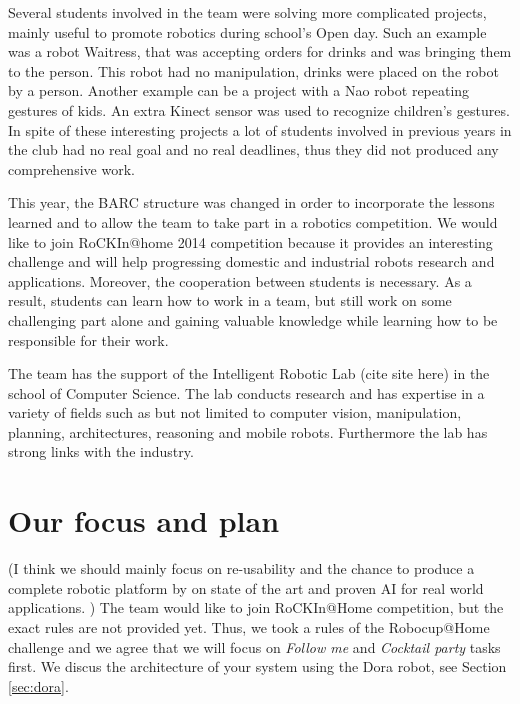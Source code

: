 \documentclass[conference]{IEEEtran}
\begin{document}
Several students involved in the team were solving more complicated projects, mainly useful to promote robotics during school's Open day. Such an example was a robot Waitress, that was accepting orders for drinks and was bringing them to the person. This robot had no manipulation, drinks were placed on the robot by a person. Another example can be a project with a Nao robot repeating gestures of kids. An extra Kinect sensor was used to recognize children's gestures. In spite of these interesting projects a lot of students involved in previous years in the club had no real goal and no real deadlines, thus they did not produced any comprehensive work.

This year, the BARC structure was changed in order to incorporate the lessons learned and to allow the team to take part in a robotics competition. We would like to join RoCKIn@home 2014 competition because it provides an interesting challenge and will help progressing domestic and industrial robots research and applications. Moreover, the cooperation between students is necessary. As a result, students can learn how to work in a team, but still work on some challenging part alone and gaining valuable knowledge while learning how to be responsible for their work.

The team has the support of the Intelligent Robotic Lab (cite site here) in the school of Computer Science. The lab conducts research and has expertise in a variety of fields such as but not limited to computer vision, manipulation, planning, architectures, reasoning and mobile robots. Furthermore the lab has strong links with the industry. 

 
\section{Our focus and plan}
(I think we should mainly focus on re-usability and the chance to produce a complete robotic platform by on state of the art and proven AI for real world applications. )
The team would like to join RoCKIn@Home competition, but the exact rules are not provided yet. Thus, we took a rules of the Robocup@Home challenge and we agree that we will focus on \textit{Follow me} and \textit{Cocktail party} tasks first. We discus the architecture of your system using the Dora robot, see Section \ref{sec:dora}.
\end{document}
